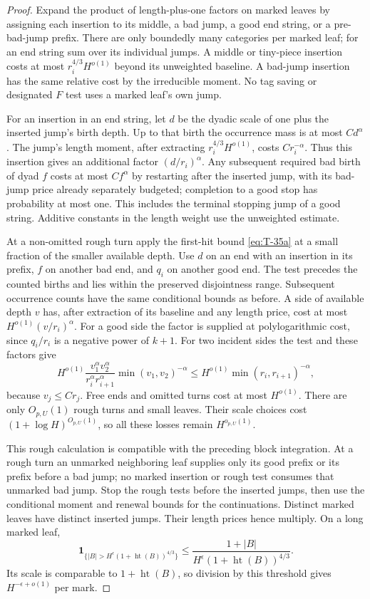 \begin{proof}
Expand the product of length-plus-one factors on marked leaves by
assigning each insertion to its middle, a bad jump, a good end string,
or a pre-bad-jump prefix. There are only boundedly many categories
per marked leaf; for an end string sum over its individual jumps.
A middle or tiny-piece insertion costs at most
$r_i^{4/3}H^{o(1)}$ beyond its unweighted baseline. A bad-jump insertion
has the same relative cost by the irreducible moment. No tag saving
or designated $F$ test uses a marked leaf's own jump.

For an insertion in an end string, let $d$ be the dyadic scale of one
plus the inserted jump's birth depth. Up to that birth the occurrence
mass is at most $Cd^\alpha$. The jump's length moment, after extracting
$r_i^{4/3}H^{o(1)}$, costs $Cr_i^{-\alpha}$. Thus this insertion gives
an additional factor $(d/r_i)^\alpha$. Any subsequent required bad
birth of dyad $f$ costs at most $Cf^\alpha$ by restarting after the
inserted jump, with its bad-jump price already separately budgeted;
completion to a good stop has probability at most one. This includes
the terminal stopping jump of a good string. Additive constants in
the length weight use the unweighted estimate.

At a non-omitted rough turn apply the first-hit bound
\eqref{eq:T-35a} at a small fraction of the smaller available depth.
Use $d$ on an end with an insertion in its prefix, $f$ on another bad
end, and $q_i$ on another good end. The test precedes the counted
births and lies within the preserved disjointness range. Subsequent
occurrence counts have the same conditional bounds as before. A
side of available depth $v$ has, after extraction of its baseline
and any length price, cost at most
$H^{o(1)}(v/r_i)^\alpha$. For a good side the factor is supplied at
polylogarithmic cost, since $q_i/r_i$ is a negative power of $k+1$.
For two incident sides the test and these factors give
\[
 H^{o(1)}\frac{v_1^\alpha v_2^\alpha}
                   {r_i^\alpha r_{i+1}^\alpha}
             \min(v_1,v_2)^{-\alpha}
 \le H^{o(1)}\min(r_i,r_{i+1})^{-\alpha},
\]
because $v_j\le Cr_j$. Free ends and omitted turns cost at most
$H^{o(1)}$. There are only $O_{p,U}(1)$ rough turns and small leaves.
Their scale choices cost $(1+\log H)^{O_{p,U}(1)}$, so all these losses
remain $H^{o_{p,U}(1)}$.

This rough calculation is compatible with the preceding block
integration. At a rough turn an unmarked neighboring leaf supplies
only its good prefix or its prefix before a bad jump; no marked
insertion or rough test consumes that unmarked bad jump. Stop the
rough tests before the inserted jumps, then use the conditional
moment and renewal bounds for the continuations. Distinct marked
leaves have distinct inserted jumps. Their length prices hence
multiply. On a long marked leaf,
\[
 \mathbf 1_{\{|B|>H^\epsilon(1+\operatorname{ht}(B))^{4/3}\}}
 \le \frac{1+|B|}{H^\epsilon(1+\operatorname{ht}(B))^{4/3}}.
\]
Its scale is comparable to $1+\operatorname{ht}(B)$, so division by
this threshold gives $H^{-\epsilon+o(1)}$ per mark.


\end{proof}
